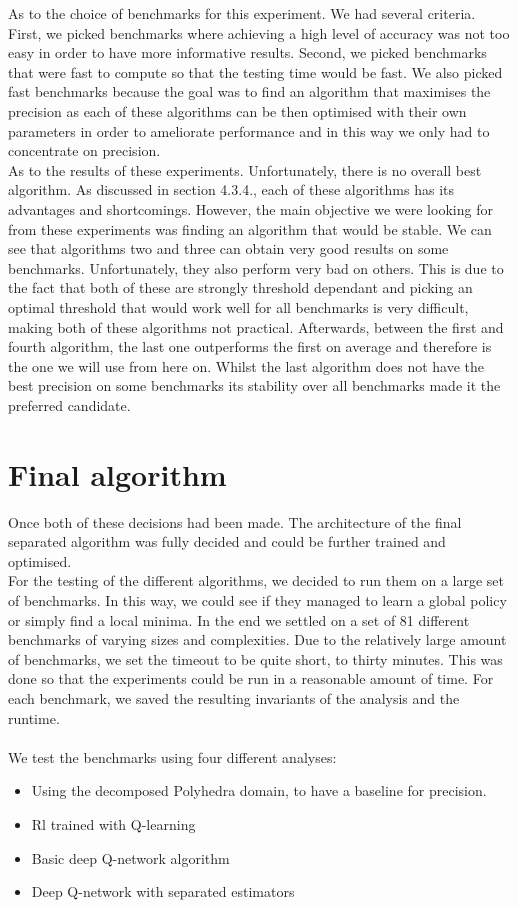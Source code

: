 As to the choice of benchmarks for this experiment. We had several criteria. First, we picked benchmarks where achieving a high level of accuracy was not too easy in order to have more informative results. Second, we picked benchmarks that were fast to compute so that the testing time would be fast. We also picked fast benchmarks because the goal was to find an algorithm that maximises the precision as each of these algorithms can be then optimised with their own parameters in order to ameliorate performance and in this way we only had to concentrate on precision.\\
As to the results of these experiments. Unfortunately, there is no overall best algorithm. As discussed in section 4.3.4., each of these algorithms has its advantages and shortcomings. However, the main objective we were looking for from these experiments was finding an algorithm that would be stable. We can see that algorithms two and three can obtain very good results on some benchmarks. Unfortunately, they also perform very bad on others. This is due to the fact that both of these are strongly threshold dependant and picking an optimal threshold that would work well for all benchmarks is very difficult, making both of these algorithms not practical. Afterwards, between the first and fourth algorithm, the last one outperforms the first on average and therefore is the one we will use from here on. Whilst the last algorithm does not have the best precision on some benchmarks its stability over all benchmarks made it the preferred candidate.


\section{Final algorithm}
Once both of these decisions had been made. The architecture of the final separated algorithm was fully decided and could be further trained and optimised.\\
For the testing of the different algorithms, we decided to run them on a large set of benchmarks. In this way, we could see if they managed to learn a global policy or simply find a local minima. In the end we settled on a set of 81 different benchmarks of varying sizes and complexities. Due to the relatively large amount of benchmarks, we set the timeout to be quite short, to thirty minutes. This was done so that the experiments could be run in a reasonable amount of time. For each benchmark, we saved the resulting invariants of the analysis and the runtime.\\
\mbox{}\\
We test the benchmarks using four different analyses:
\begin{itemize}
	\item Using the decomposed Polyhedra domain, to have a baseline for precision.
	\item Rl trained with Q-learning
	\item Basic deep Q-network algorithm
	\item Deep Q-network with separated estimators
\end{itemize}

